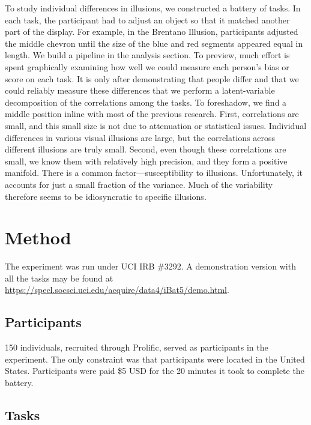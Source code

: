 \documentclass[man, 12pt]{apa7} %
\begin{document}
To study individual differences in illusions, we constructed a battery of tasks. In each task, the participant had to adjust an object so that it matched another part of the display.  For example, in the Brentano Illusion, participants adjusted the middle chevron until the size of the blue and red segments appeared equal in length.  We build a pipeline in the analysis section.  To preview, much effort is spent graphically examining how well we could measure each person's bias or score on each task.  It is only after demonstrating that people differ and that we could reliably measure these differences that we perform a latent-variable decomposition of the correlations among the tasks.  To foreshadow, we find a middle position inline with most of the previous research.  First, correlations are small, and this small size is not due to attenuation or statistical issues.  Individual differences in various visual illusions are large, but the correlations across different illusions are truly small.  Second, even though these correlations are small, we know them with relatively high precision, and they form a positive manifold. There is a common factor---susceptibility to illusions.  Unfortunately, it accounts for just a small fraction of the variance.  Much of the variability therefore seems to be idiosyncratic to specific illusions.

\section{Method}

The experiment was run under UCI IRB \#3292. A demonstration version with all the tasks may be found at \href{https://specl.socsci.uci.edu/acquire/data4/iBat5/demo.html}{https://specl.socsci.uci.edu/acquire/data4/iBat5/demo.html}.

\subsection{Participants}

150 individuals, recruited through Prolific, served as participants in the experiment. The only constraint was that participants were located in the United States.  Participants were paid  \$5 USD for the 20 minutes it took to complete the battery.


\subsection{Tasks} 
\end{document}
